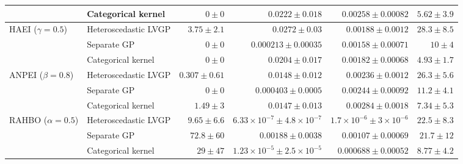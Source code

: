 \begin{table}[htbp]
\begin{tabular}{llrrrr}
 & Categorical kernel & \colorbox{green!20}{{\boldmath$0 \pm 0$}} & $0.0222 \pm 0.018$ & $0.00258 \pm 0.00082$ & {\boldmath$5.62 \pm 3.9$} \\
\midrule
HAEI ($\gamma=0.5$) & Heteroscedastic LVGP & $3.75 \pm 2.1$ & $0.0272 \pm 0.03$ & $0.00188 \pm 0.0012$ & $28.3 \pm 8.5$ \\
 & Separate GP & \colorbox{green!20}{{\boldmath$0 \pm 0$}} & {\boldmath$0.000213 \pm 0.00035$} & {\boldmath$0.00158 \pm 0.00071$} & $10 \pm 4$ \\
 & Categorical kernel & \colorbox{green!20}{{\boldmath$0 \pm 0$}} & $0.0204 \pm 0.017$ & $0.00182 \pm 0.00068$ & {\boldmath$4.93 \pm 1.7$} \\
\midrule
ANPEI ($\beta=0.8$) & Heteroscedastic LVGP & $0.307 \pm 0.61$ & $0.0148 \pm 0.012$ & {\boldmath$0.00236 \pm 0.0012$} & $26.3 \pm 5.6$ \\
 & Separate GP & \colorbox{green!20}{{\boldmath$0 \pm 0$}} & {\boldmath$0.000403 \pm 0.0005$} & $0.00244 \pm 0.00092$ & $11.2 \pm 4.1$ \\
 & Categorical kernel & $1.49 \pm 3$ & $0.0147 \pm 0.013$ & $0.00284 \pm 0.0018$ & {\boldmath$7.34 \pm 5.3$} \\
\midrule
RAHBO ($\alpha=0.5$) & Heteroscedastic LVGP & {\boldmath$9.65 \pm 6.6$} & {\boldmath$6.33{\times}10^{-7} \pm 4.8{\times}10^{-7}$} & {\boldmath$1.7{\times}10^{-6} \pm 3{\times}10^{-6}$} & $22.5 \pm 8.3$ \\
 & Separate GP & $72.8 \pm 60$ & $0.00188 \pm 0.0038$ & $0.00107 \pm 0.00069$ & $21.7 \pm 12$ \\
 & Categorical kernel & $29 \pm 47$ & $1.23{\times}10^{-5} \pm 2.5{\times}10^{-5}$ & $0.000688 \pm 0.00052$ & {\boldmath$8.77 \pm 4.2$} \\
\bottomrule
\end{tabular}
\end{table}
